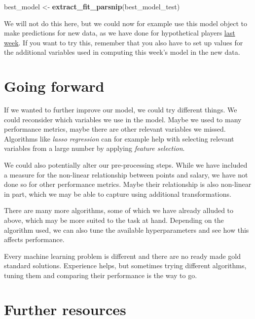 \documentclass[
]{book}
\newenvironment{Shaded}{\begin{snugshade}}{\end{snugshade}}
\newcommand{\FunctionTok}[1]{\textcolor[rgb]{0.13,0.29,0.53}{\textbf{#1}}}
\newcommand{\NormalTok}[1]{#1}
\newcommand{\OtherTok}[1]{\textcolor[rgb]{0.56,0.35,0.01}{#1}}
\begin{document}
\begin{Shaded}
\begin{Highlighting}[]
\NormalTok{best\_model }\OtherTok{\textless{}{-}} \FunctionTok{extract\_fit\_parsnip}\NormalTok{(best\_model\_test)}
\end{Highlighting}
\end{Shaded}

We will not do this here, but we could now for example use this model object
to make predictions for new data, as we have done for hypothetical players
\protect\hyperlink{pm-t}{last week}. If you want to try this, remember that you also have to
set up values for the additional variables used in computing this week's model
in the new data.

\hypertarget{going-forward}{%
\section{Going forward}\label{going-forward}}

If we wanted to further improve our model, we could try different things.
We could reconsider which variables we use in the model. Maybe we used to many
performance metrics, maybe there are other relevant variables we missed.
Algorithms like \emph{lasso regression} can for example help with selecting relevant
variables from a large number by applying \emph{feature selection}.

We could also potentially alter our pre-processing steps.
While we have included a measure for the non-linear
relationship between points and salary, we have not done so for other
performance metrics. Maybe their relationship is also non-linear in part, which
we may be able to capture using additional transformations.

There are many more algorithms, some of which we have already alluded to above,
which may be more suited to the task at hand.
Depending on the algorithm used, we can also tune the available hyperparameters
and see how this affects performance.

Every machine learning problem is different and there are no ready made gold
standard solutions. Experience helps, but sometimes trying different algorithms,
tuning them and comparing their performance is the way to go.

\hypertarget{further-resources-3}{%
\section{Further resources}\label{further-resources-3}}
\end{document}
